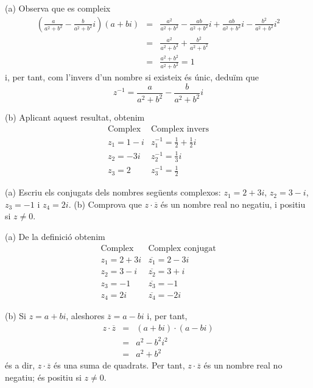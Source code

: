 \begin{solucio}
(a) Observa que es compleix
\begin{eqnarray*}
\left( \frac{a}{a^{2}+b^{2}}-\frac{b}{a^{2}+b^{2}}i\right) (a+bi) &=&\frac{
a^{2}}{a^{2}+b^{2}}-\frac{ab}{a^{2}+b^{2}}i+\frac{ab}{a^{2}+b^{2}}i-\frac{
b^{2}}{a^{2}+b^{2}}i^{2} \\
&=&\frac{a^{2}}{a^{2}+b^{2}}+\frac{b^{2}}{a^{2}+b^{2}} \\
&=&\frac{a^{2}+b^{2}}{a^{2}+b^{2}}=1
\end{eqnarray*}
i, per tant, com l’invers d’un nombre si existeix és únic,
deduïm que
\begin{equation*}
z^{-1}=\frac{a}{a^{2}+b^{2}}-\frac{b}{a^{2}+b^{2}}i
\end{equation*}

(b) Aplicant aquest resultat, obtenim
\begin{equation*}
\begin{array}{ll}
\text{Complex} & \text{Complex invers} \\
z_{1}=1-i & z_{1}^{-1}=\frac{1}{2}+\frac{1}{2}i \\
z_{2}=-3i & z_{2}^{-1}=\frac{1}{3}i \\
z_{3}=2 & z_{3}^{-1}=\frac{1}{2}
\end{array}
\end{equation*}
\end{solucio}

\begin{exemple}
(a) Escriu els conjugats dels nombres següents complexos: $
z_{1}=2+3i$, $z_{2}=3-i$, $z_{3}=-1$ i $z_{4}=2i$. (b) Comprova que $z\cdot
\overline{z}$ és un nombre real no negatiu, i positiu si $z\neq 0$.
\end{exemple}

\begin{solucio}
(a) De la definició obtenim
\begin{equation*}
\begin{array}{ll}
\text{Complex} & \text{Complex conjugat} \\
z_{1}=2+3i & \overline{z_{1}}=2-3i \\
z_{2}=3-i & \overline{z_{2}}=3+i \\
z_{3}=-1 & \overline{z_{3}}=-1 \\
z_{4}=2i & \overline{z_{4}}=-2i
\end{array}
\end{equation*}

(b) Si $z=a+bi$, aleshores \thinspace $\overline{z}=a-bi$ i, per tant,
\begin{eqnarray*}
z\cdot \overline{z} &=&(a+bi)\cdot (a-bi) \\
&=&a^{2}-b^{2}i^{2} \\
&=&a^{2}+b^{2}
\end{eqnarray*}
és a dir, $z\cdot \overline{z}$ és una suma de quadrats. Per tant, $
z\cdot \overline{z}$ és un nombre real no negatiu; és positiu si $z\neq 0$.
\end{solucio}

